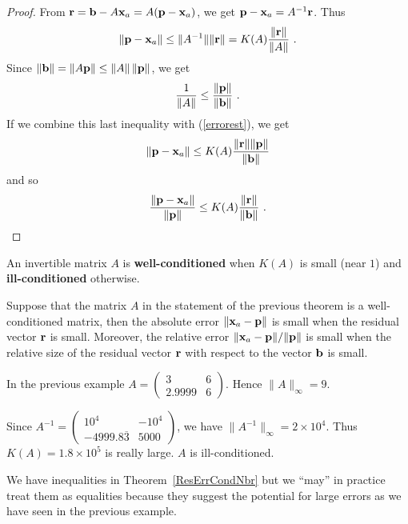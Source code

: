 \begin{proof}
From $\mathbf{r} = \mathbf{b} - A\mathbf{x}_a = A(\mathbf{p} - \mathbf{x}_a)$, we get
$\mathbf{p} - \mathbf{x}_a = A^{-1}\mathbf{r}$.  Thus
\begin{equation}\label{errorest}
\| \mathbf{p} - \mathbf{x}_a \| \leq \| A^{-1} \| \|\mathbf{r}\| =
K(A) \frac{\|\mathbf{r}\|} {\|A\|} \ .
\end{equation}
Since $\| \mathbf{b} \| = \|A\mathbf{p} \| \leq \|A\|\, \|\mathbf{p}\|$,
we get
\[
\frac{1}{\|A\|} \leq \frac{\|\mathbf{p}\|}{\|\mathbf{b}\|} \ .
\]
If we combine this last inequality with (\ref{errorest}), we get
\[
\| \mathbf{p} - \mathbf{x}_a \| \leq K(A)
\frac{\|\mathbf{r}\|\|\mathbf{p}\|}{\|\mathbf{b}\|}
\]
and so
\[
\frac{\| \mathbf{p} - \mathbf{x}_a \|}{\|\mathbf{p}\|} \leq K(A)
\frac{\|\mathbf{r}\|}{\|\mathbf{b}\|} \ .  \qedhere
\]
\end{proof}

\begin{defn}
An invertible matrix $A$ is
{\bfseries well-conditioned} when $K(A)$
is small (near $1$) and
{\bfseries ill-conditioned} otherwise.
\end{defn}

\begin{rmk}
Suppose that the matrix $A$ in the statement of the previous theorem
is a well-conditioned matrix, then the absolute error
$\| \mathbf{x}_a - \mathbf{p}\|$ is small when the residual vector
$\mathbf{r}$ is small.  Moreover, the relative error
$\| \mathbf{x}_a - \mathbf{p} \|/\|\mathbf{p} \|$ is
small when the relative size of the residual vector $\mathbf{r}$ with
respect to the vector $\mathbf{b}$ is small.
\end{rmk}

\begin{egg}
In the previous example
$\displaystyle
A = \begin{pmatrix}
3 & 6 \\
2.9999 & 6
\end{pmatrix}
$.  Hence $\|A\|_\infty = 9$.

Since
$\displaystyle
A^{-1} = \begin{pmatrix}
10^4 & -10^4 \\
-4999.8\overline{3} & 5000
\end{pmatrix} 
$, we have
$\| A^{-1}\|_\infty = 2\times 10^4$.
Thus $K(A) = 1.8\times 10^5$ is really large.  $A$ is
ill-conditioned.

We have inequalities in Theorem~\ref{ResErrCondNbr} but we ``may'' in
practice treat them as equalities because they suggest the
potential for large errors as we have seen in the previous example.
\end{egg}


